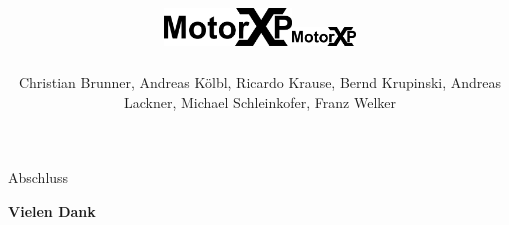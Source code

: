 \documentclass[14pt]{beamer}
\title{\includegraphics[height=1cm]{../images/MotorXP}}
\author{Christian Brunner, Andreas Kölbl, Ricardo Krause, Bernd Krupinski, Andreas Lackner, Michael Schleinkofer, Franz Welker}
\begin{document}
\begingroup
\makeatletter
\setlength{\hoffset}{-.5\beamer@sidebarwidth}
\makeatother
\begin{frame}[plain]
  \titlepage
\end{frame}
\endgroup
  \title{\includegraphics[height=0.5cm]{../images/MotorXP}}
  \author{}










\begin{frame}{Abschluss}
\centering 
	\begin{huge}
		\textbf{Vielen Dank}
	\end{huge}
\end{frame}
\end{document}
